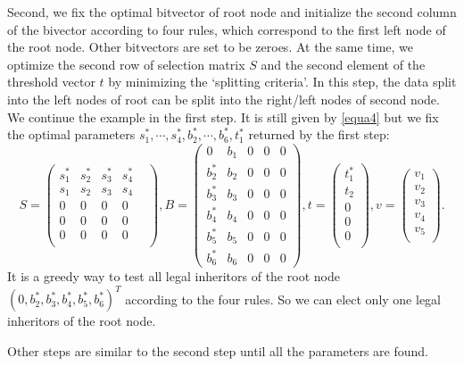 \documentclass[UTF8]{article}
\begin{document}
Second, we fix the optimal bitvector of root node
and  initialize the second column of the bivector according to four rules,
which correspond to the first left node of the root node.
Other bitvectors are set to be zeroes.
At the same time, we optimize the second row of selection matrix $S$ and
the second element of the threshold vector $t$ by minimizing the `splitting criteria'.
In this step, the data split into the left nodes of root can be split into the right/left nodes of second node.
We continue the example in the first step. It is still given by \eqref{equa4} but we fix the optimal parameters
$s_1^{\ast}, \cdots, s_4^{\ast}, b_2^{\ast},\cdots, b_6^{\ast}, t_1^{\ast}$ returned by the first step:
$$
S=\begin{pmatrix}
s_1^{\ast} & s_2^{\ast} & s_3^{\ast} & s_4^{\ast} \\
s_1 & s_2 & s_3 & s_4 \\
0 & 0& 0& 0& \\
0 & 0& 0& 0& \\
0 & 0& 0& 0& \\
\end{pmatrix},
B=
\begin{pmatrix}
0          & b_1 & 0 & 0 & 0\\
b_2^{\ast} & b_2 & 0 & 0 & 0\\
b_3^{\ast} & b_3 & 0 & 0 & 0\\
b_4^{\ast} & b_4 & 0 & 0 & 0\\
b_5^{\ast} & b_5 & 0 & 0 & 0\\
b_6^{\ast} & b_6 & 0 & 0 & 0
\end{pmatrix},
t=\begin{pmatrix}
t_1^{\ast}\\ t_2\\ 0\\ 0\\ 0\\
\end{pmatrix},
v=\begin{pmatrix}
v_1\\ v_2\\ v_3\\ v_4\\ v_5\\
\end{pmatrix}.
$$
It is a greedy way to test all legal inheritors of the root node
$(0,b_2^{\ast},b_3^{\ast},b_4^{\ast},b_5^{\ast},b_6^{\ast})^T$ according to the four rules.
So we can elect only one legal inheritors of the root node.

Other steps are similar to the second step until all the parameters are found.
\end{document}

